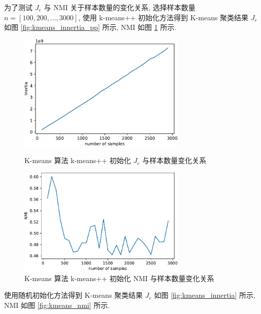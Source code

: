 \documentclass[openany]{ctexbook}
\theoremstyle{kaiti}
\theoremstyle{normal}
\begin{document}
为了测试 $J_e$ 与 NMI 关于样本数量的变化关系, 选择样本数量 $n=[100,200,\dots,3000]$, 使用 k-means++ 初始化方法得到 K-means 聚类结果 $J_e$ 如图 \ref{fig:kmeans_innertia_pp} 所示, NMI 如图 \ref{fig:kmeans_nmi_pp} 所示.

\begin{figure}[htbp]
  \centering
  \begin{minipage}[t]{0.48\textwidth}
    \centering
    \includegraphics[width=8cm]{kmeans_innertia_pp.pdf}
    \caption{K-means 算法 k-means++ 初始化 $J_e$ 与样本数量变化关系}
    \label{fig:kmeans_innertia_pp}
  \end{minipage}
  \begin{minipage}[t]{0.48\textwidth}
    \centering
    \includegraphics[width=8cm]{kmeans_nmi_pp.pdf}
    \caption{K-means 算法 k-means++ 初始化 NMI 与样本数量变化关系}
    \label{fig:kmeans_nmi_pp}
  \end{minipage}
\end{figure}

使用随机初始化方法得到 K-means 聚类结果 $J_e$ 如图 \ref{fig:kmeans_innertia}  所示, NMI 如图 \ref{fig:kmeans_nmi} 所示.
\end{document}
